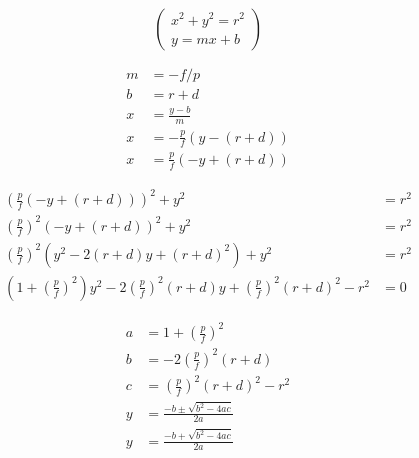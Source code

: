 \documentclass{article}
\begin{document}
\[ %
\begin{pmatrix}
x^2 + y^2 = r^2 \\
y = mx + b
\end{pmatrix}
\]

\[ %
\begin{aligned}
m &= -f/p \\
b &= r + d \\
x &= \frac{y - b}{m} \\
x &= -\frac{p}{f} (y - (r + d)) \\
x &= \frac{p}{f} (-y + (r + d))
\end{aligned}
\]

\[ %
\begin{aligned}
\left(\frac{p}{f} (-y + (r + d))\right)^2 + y^2 &= r^2 \\
\left(\frac{p}{f}\right)^2 (-y + (r + d))^2 + y^2 &= r^2 \\
\left(\frac{p}{f}\right)^2 (y^2 - 2(r + d)y + (r + d)^2) + y^2 &= r^2 \\
\left(1 + \left(\frac{p}{f}\right)^2\right)y^2 -
  2 \left(\frac{p}{f}\right)^2 (r + d)y +
  \left(\frac{p}{f}\right)^2 (r + d)^2 - r^2 &= 0
\end{aligned}
\]

\[ %
\begin{aligned}
a &= 1 + \left(\frac{p}{f}\right)^2 \\
b &= -2\left(\frac{p}{f}\right)^2 (r + d) \\
c &= \left(\frac{p}{f}\right)^2 (r + d)^2 - r^2 \\
y &= \frac{-b \pm \sqrt{b^2 - 4ac}}{2a} \\
y &= \frac{-b + \sqrt{b^2 - 4ac}}{2a}
\end{aligned}
\]
\end{document}

